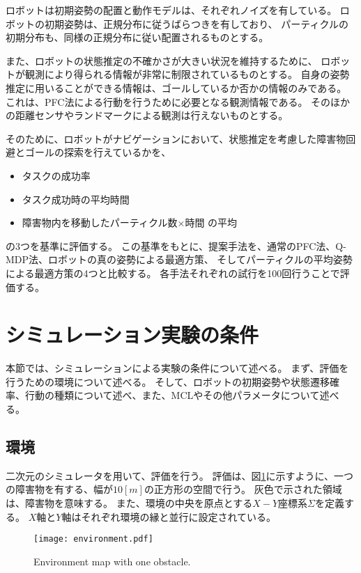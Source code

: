 ロボットは初期姿勢の配置と動作モデルは、それぞれノイズを有している。
ロボットの初期姿勢は、正規分布に従うばらつきを有しており、
パーティクルの初期分布も、同様の正規分布に従い配置されるものとする。

また、ロボットの状態推定の不確かさが大きい状況を維持するために、
ロボットが観測により得られる情報が非常に制限されているものとする。
自身の姿勢推定に用いることができる情報は、ゴールしているか否かの情報のみである。
これは、PFC法による行動を行うために必要となる観測情報である。
そのほかの距離センサやランドマークによる観測は行えないものとする。

そのために、ロボットがナビゲーションにおいて、状態推定を考慮した障害物回避とゴールの探索を行えているかを、
\begin{itemize}
  \item タスクの成功率
  \item タスク成功時の平均時間
  \item 障害物内を移動したパーティクル数×時間 の平均
\end{itemize}
の3つを基準に評価する。
この基準をもとに、提案手法を、通常のPFC法、Q-MDP法、ロボットの真の姿勢による最適方策、
そしてパーティクルの平均姿勢による最適方策の4つと比較する。
各手法それぞれの試行を100回行うことで評価する。


\section{シミュレーション実験の条件} \label{section:実験条件}
本節では、シミュレーションによる実験の条件について述べる。
まず、評価を行うための環境について述べる。
そして、ロボットの初期姿勢や状態遷移確率、行動の種類について述べ、また、MCLやその他パラメータについて述べる。

\subsection{環境}
二次元のシミュレータを用いて、評価を行う。
評価は、図\ref{fig:environment}に示すように、一つの障害物を有する、幅が$10[\si{m}]$の正方形の空間で行う。
灰色で示された領域は、障害物を意味する。
また、環境の中央を原点とする$X-Y$座標系$\Sigma$を定義する。
$X$軸と$Y$軸はそれぞれ環境の縁と並行に設定されている。
\begin{figure}[tbp]
  \begin{center}
    \texttt{[image: environment.pdf]}
    \caption{Environment map with one obstacle.}
    \label{fig:environment}
  \end{center}
\end{figure}

